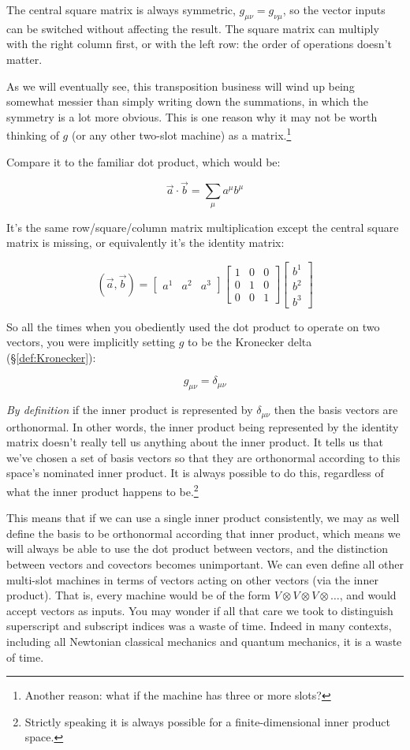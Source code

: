 The central square matrix is always symmetric, $g_{\mu\nu} = g_{\nu\mu}$, so the vector inputs can be switched without affecting the result. The square matrix can multiply with the right column first, or with the left row: the order of operations doesn't matter.

As we will eventually see, this transposition business will wind up being somewhat messier than simply writing down the summations, in which the symmetry is a lot more obvious. This is one reason why it may not be worth thinking of $g$ (or any other two-slot machine) as a matrix.\footnote{Another reason: what if the machine has three or more slots?}

Compare it to the familiar dot product, which would be:

$$
\vec{a} \cdot \vec{b} = \sum_{\mu} a^\mu b^\mu
$$

It's the same row/square/column matrix multiplication except the central square matrix is missing, or equivalently it's the identity matrix:

$$
(\vec{a}, \vec{b}) =
\begin{bmatrix}
a^1 & a^2 & a^3
\end{bmatrix}
\begin{bmatrix}
1 & 0 & 0 \\
0 & 1 & 0 \\
0 & 0 & 1
\end{bmatrix}
\begin{bmatrix}
b^1 \\ b^2 \\ b^3
\end{bmatrix}
$$

So all the times when you obediently used the dot product to operate on two vectors, you were implicitly setting $g$ to be the Kronecker delta (§\ref{def:Kronecker}):

$$
g_{\mu\nu} = \delta_{\mu\nu}
$$

\textit{By definition} if the inner product is represented by $\delta_{\mu\nu}$ then the basis vectors are orthonormal. In other words, the inner product being represented by the identity matrix doesn't really tell us anything about the inner product. It tells us that we've chosen a set of basis vectors so that they are orthonormal according to this space's nominated inner product. It is always possible to do this, regardless of what the inner product happens to be.\footnote{Strictly speaking it is always possible for a finite-dimensional inner product space.}

This means that if we can use a single inner product consistently, we may as well define the basis to be orthonormal according that inner product, which means we will always be able to use the dot product between vectors, and the distinction between vectors and covectors becomes unimportant. We can even define all other multi-slot machines in terms of vectors acting on other vectors (via the inner product). That is, every machine would be of the form $V \otimes V \otimes V \otimes \ldots$, and would accept vectors as inputs. You may wonder if all that care we took to distinguish superscript and subscript indices was a waste of time. Indeed in many contexts, including all Newtonian classical mechanics and quantum mechanics, it is a waste of time.

